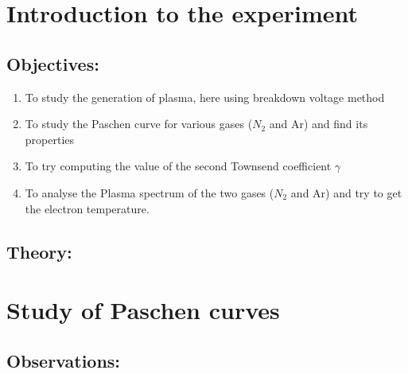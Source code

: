 \documentclass[]{report}[12 pt]
\begin{document}
	
	\tableofcontents
\chapter{Introduction to the experiment}
	\section*{Objectives:}
\begin{enumerate}
	\item To study the generation of plasma, here using breakdown voltage method
	\item To study the Paschen curve for various gases ($N_2$ and Ar) and find its properties
	\item To try computing the value of the second Townsend coefficient $\gamma$
	\item To analyse the Plasma spectrum of the two gases ($N_2$ and Ar) and try to get the electron temperature.
\end{enumerate}

\section*{Theory:}

\chapter{Study of Paschen curves}
\section{Observations:}
\end{document}
